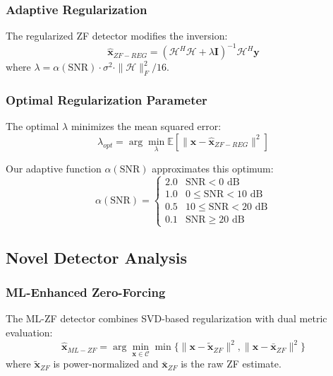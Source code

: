 \subsubsection{Adaptive Regularization}
The regularized ZF detector modifies the inversion:
\begin{equation}
\hat{\mathbf{x}}_{ZF-REG} = (\mathcal{H}^H\mathcal{H} + \lambda\mathbf{I})^{-1}\mathcal{H}^H\mathbf{y}
\end{equation}
where $\lambda = \alpha(\text{SNR}) \cdot \sigma^2 \cdot \|\mathcal{H}\|_F^2/16$.

\subsubsection{Optimal Regularization Parameter}
The optimal $\lambda$ minimizes the mean squared error:
\begin{equation}
\lambda_{opt} = \arg \min_{\lambda} \mathbb{E}\left[\|\mathbf{x} - \hat{\mathbf{x}}_{ZF-REG}\|^2\right]
\end{equation}

Our adaptive function $\alpha(\text{SNR})$ approximates this optimum:
\begin{equation}
\alpha(\text{SNR}) = \begin{cases}
2.0 & \text{SNR} < 0 \text{ dB} \\
1.0 & 0 \leq \text{SNR} < 10 \text{ dB} \\
0.5 & 10 \leq \text{SNR} < 20 \text{ dB} \\
0.1 & \text{SNR} \geq 20 \text{ dB}
\end{cases}
\end{equation}

\subsection{Novel Detector Analysis}

\subsubsection{ML-Enhanced Zero-Forcing}
The ML-ZF detector combines SVD-based regularization with dual metric evaluation:
\begin{equation}
\hat{\mathbf{x}}_{ML-ZF} = \arg \min_{\mathbf{x} \in \mathcal{C}} \min\{\|\mathbf{x} - \tilde{\mathbf{x}}_{ZF}\|^2, \|\mathbf{x} - \bar{\mathbf{x}}_{ZF}\|^2\}
\end{equation}
where $\tilde{\mathbf{x}}_{ZF}$ is power-normalized and $\bar{\mathbf{x}}_{ZF}$ is the raw ZF estimate.

